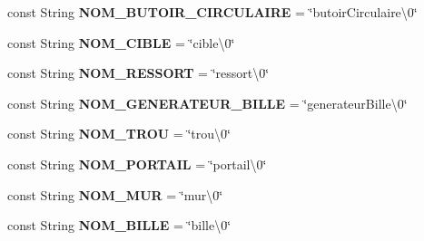 \begin{DoxyCompactItemize}
\item 
\hypertarget{class_interface_graphique_1_1_mode_editeur_a7a8b2526b24769fd740b4dc4009eb995}{const String {\bfseries N\-O\-M\-\_\-\-B\-U\-T\-O\-I\-R\-\_\-\-C\-I\-R\-C\-U\-L\-A\-I\-R\-E} = \char`\"{}butoir\-Circulaire\textbackslash{}0\char`\"{}}\label{class_interface_graphique_1_1_mode_editeur_a7a8b2526b24769fd740b4dc4009eb995}

\item 
\hypertarget{class_interface_graphique_1_1_mode_editeur_a5890d47c3c572e33bb8216aeebb851be}{const String {\bfseries N\-O\-M\-\_\-\-C\-I\-B\-L\-E} = \char`\"{}cible\textbackslash{}0\char`\"{}}\label{class_interface_graphique_1_1_mode_editeur_a5890d47c3c572e33bb8216aeebb851be}

\item 
\hypertarget{class_interface_graphique_1_1_mode_editeur_af7d4f3681200e7a2b054fe92f6200b3d}{const String {\bfseries N\-O\-M\-\_\-\-R\-E\-S\-S\-O\-R\-T} = \char`\"{}ressort\textbackslash{}0\char`\"{}}\label{class_interface_graphique_1_1_mode_editeur_af7d4f3681200e7a2b054fe92f6200b3d}

\item 
\hypertarget{class_interface_graphique_1_1_mode_editeur_a2b70e220fa60245157bbece9d551e5a8}{const String {\bfseries N\-O\-M\-\_\-\-G\-E\-N\-E\-R\-A\-T\-E\-U\-R\-\_\-\-B\-I\-L\-L\-E} = \char`\"{}generateur\-Bille\textbackslash{}0\char`\"{}}\label{class_interface_graphique_1_1_mode_editeur_a2b70e220fa60245157bbece9d551e5a8}

\item 
\hypertarget{class_interface_graphique_1_1_mode_editeur_a0c9ec65075e4af1fc85da53da4972e94}{const String {\bfseries N\-O\-M\-\_\-\-T\-R\-O\-U} = \char`\"{}trou\textbackslash{}0\char`\"{}}\label{class_interface_graphique_1_1_mode_editeur_a0c9ec65075e4af1fc85da53da4972e94}

\item 
\hypertarget{class_interface_graphique_1_1_mode_editeur_aadd5c7a6609f936011a320dd07b41614}{const String {\bfseries N\-O\-M\-\_\-\-P\-O\-R\-T\-A\-I\-L} = \char`\"{}portail\textbackslash{}0\char`\"{}}\label{class_interface_graphique_1_1_mode_editeur_aadd5c7a6609f936011a320dd07b41614}

\item 
\hypertarget{class_interface_graphique_1_1_mode_editeur_a134c8cc1e90c417cdf1ae062555fde11}{const String {\bfseries N\-O\-M\-\_\-\-M\-U\-R} = \char`\"{}mur\textbackslash{}0\char`\"{}}\label{class_interface_graphique_1_1_mode_editeur_a134c8cc1e90c417cdf1ae062555fde11}

\item 
\hypertarget{class_interface_graphique_1_1_mode_editeur_ab11f664023d682dfb03a935b52f1d57e}{const String {\bfseries N\-O\-M\-\_\-\-B\-I\-L\-L\-E} = \char`\"{}bille\textbackslash{}0\char`\"{}}\label{class_interface_graphique_1_1_mode_editeur_ab11f664023d682dfb03a935b52f1d57e}

\end{DoxyCompactItemize}
